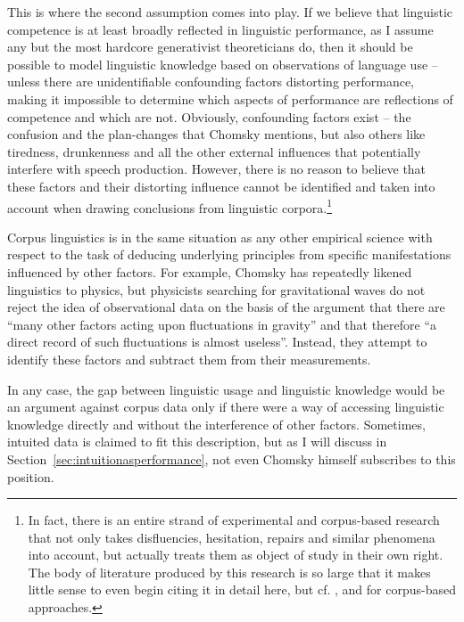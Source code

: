 This is where the second assumption comes into play. If we believe that linguistic competence  is at least broadly reflected in linguistic performance,  as I assume any but the most hardcore generativist  theoreticians do, then it should be possible to model linguistic knowledge based on observations  of language use -- unless there are unidentifiable confounding factors distorting performance,  making it impossible to determine which aspects of performance are reflections of competence  and which are not. Obviously, confounding factors exist -- the confusion and the plan\hyp{}changes that Chomsky mentions, but also others like tiredness, drunkenness and all the other external influences that potentially interfere with speech production. However, there is no reason to believe that these factors and their distorting influence cannot be identified and taken into account when drawing conclusions from linguistic corpora.\footnote{In fact, there is an entire strand of experimental  and corpus\hyp{}based research that not only takes disfluencies, hesitation, repairs and similar phenomena into account, but actually treats them as object of study in their own right. The body of literature produced by this research is so large that it makes little sense to even begin citing it in detail here, but cf. \citet{kjellmer_hesitation._2003}, \citet{corley_hesitation_2008} and \citet{gilquin_errors_2011} for corpus\hyp{}based approaches.}

Corpus linguistics is in the same situation as any other empirical science with respect to the task of deducing underlying principles from specific manifestations influenced by other factors. For example, Chomsky has repeatedly likened linguistics to physics, but physicists searching for gravitational waves do not reject the idea of observational  data on the basis of the argument that there are ``many other factors acting upon fluctuations in gravity'' and that therefore ``a direct record of such fluctuations is almost useless''. Instead, they attempt to identify these factors and subtract them from their measurements.

In any case, the gap between linguistic usage and linguistic knowledge would be an argument against corpus data only if there were a way of accessing linguistic knowledge directly and without the interference of other factors. Sometimes, intuited  data is claimed to fit this description, but as I will discuss in Section~\ref{sec:intuitionasperformance}, not even Chomsky himself subscribes to this position.

